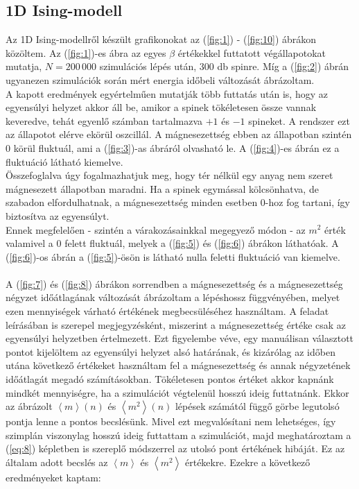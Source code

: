 \subsection{1D Ising-modell}
Az 1D Ising-modellről készült grafikonokat az (\ref{fig:1}) - (\ref{fig:10}) ábrákon közöltem. Az (\ref{fig:1})-es ábra az egyes $\beta$ értékekkel futtatott végállapotokat mutatja, $N = 200\,000$ szimulációs lépés után, $300$ db spinre. Míg a (\ref{fig:2}) ábrán ugyanezen szimulációk során mért energia időbeli változását ábrázoltam. \\
A kapott eredmények egyértelműen mutatják több futtatás után is, hogy az egyensúlyi helyzet akkor áll be, amikor a spinek tökéletesen össze vannak keveredve, tehát egyenlő számban tartalmazva $+1$ és $-1$ spineket. A rendszer ezt az állapotot elérve ekörül oszcillál. A mágnesezettség ebben az állapotban szintén $0$ körül fluktuál, ami a (\ref{fig:3})-as ábráról olvasható le. A (\ref{fig:4})-es ábrán ez a fluktuáció látható kiemelve. \\
Összefoglalva úgy fogalmazhatjuk meg, hogy tér nélkül egy anyag nem szeret mágnesezett állapotban maradni. Ha a spinek egymással kölcsönhatva, de szabadon elfordulhatnak, a mágnesezettség minden esetben $0$-hoz fog tartani, így biztosítva az egyensúlyt. \\
Ennek megfelelően - szintén a várakozásainkkal megegyező módon - az $m^{2}$ érték valamivel a $0$ felett fluktuál, melyek a (\ref{fig:5}) és (\ref{fig:6}) ábrákon láthatóak. A (\ref{fig:6})-os ábrán a (\ref{fig:5})-ösön is látható nulla feletti fluktuáció van kiemelve.
\\ \\
A (\ref{fig:7}) és (\ref{fig:8}) ábrákon sorrendben a mágnesezettség és a mágnesezettség négyzet időátlagának változását ábrázoltam a lépéshossz függvényében, melyet ezen mennyiségek várható értékének megbecsüléséhez használtam. A feladat leírásában is szerepel megjegyzésként, miszerint a mágnesezettség értéke csak az egyensúlyi helyzetben értelmezett. Ezt figyelembe véve, egy manuálisan választott pontot kijelöltem az egyensúlyi helyzet alsó határának, és kizárólag az időben utána következő értékeket használtam fel a mágnesezettség és annak négyzetének időátlagát megadó számításokban. Tökéletesen pontos értéket akkor kapnánk mindkét mennyiségre, ha a szimulációt végtelenül hosszú ideig futtatnánk. Ekkor az ábrázolt $\left< m \right> \left( n \right)$ és $\left< m^{2} \right> \left( n \right)$ lépések számától függő görbe legutolsó pontja lenne a pontos becslésünk. Mivel ezt megvalósítani nem lehetséges, így szimplán viszonylag hosszú ideig futtattam a szimulációt, majd meghatároztam a (\ref{eq:8}) képletben is szereplő módszerrel az utolsó pont értékének hibáját. Ez az általam adott becslés az $\left< m \right>$ és $\left< m^{2} \right>$ értékekre. Ezekre a következő eredményeket kaptam:

